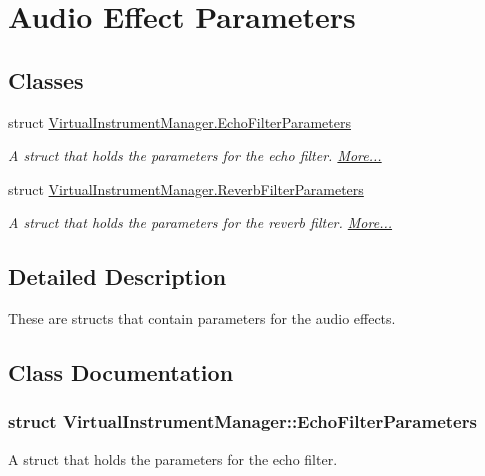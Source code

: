 \hypertarget{group__filter_params}{}\section{Audio Effect Parameters}
\label{group__filter_params}
\subsection*{Classes}
\begin{DoxyCompactItemize}
\item 
struct \hyperlink{group__filter_params_struct_virtual_instrument_manager_1_1_echo_filter_parameters}{Virtual\+Instrument\+Manager.\+Echo\+Filter\+Parameters}
\begin{DoxyCompactList}\small\item\em A struct that holds the parameters for the echo filter.  \hyperlink{group__filter_params_struct_virtual_instrument_manager_1_1_echo_filter_parameters}{More...}\end{DoxyCompactList}\item 
struct \hyperlink{group__filter_params_struct_virtual_instrument_manager_1_1_reverb_filter_parameters}{Virtual\+Instrument\+Manager.\+Reverb\+Filter\+Parameters}
\begin{DoxyCompactList}\small\item\em A struct that holds the parameters for the reverb filter.  \hyperlink{group__filter_params_struct_virtual_instrument_manager_1_1_reverb_filter_parameters}{More...}\end{DoxyCompactList}\end{DoxyCompactItemize}


\subsection{Detailed Description}
These are structs that contain parameters for the audio effects. 

\subsection{Class Documentation}
\label{struct_virtual_instrument_manager_1_1_echo_filter_parameters}
\subsubsection{struct Virtual\+Instrument\+Manager\+:\+:Echo\+Filter\+Parameters}
A struct that holds the parameters for the echo filter. 

